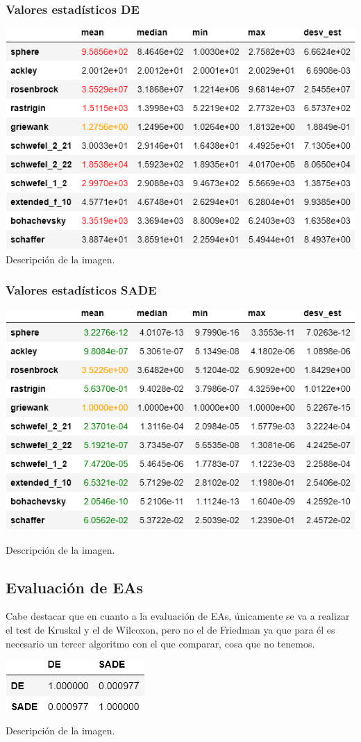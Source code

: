 \documentclass[11pt, a4paper, titlepage]{article}
\begin{document}
\subsubsection{Valores estadísticos DE}
\includegraphics[width=\textwidth]{tableDE.png}
Descripción de la imagen.
\subsubsection{Valores estadísticos SADE}
\begin{center}
\includegraphics[width=\textwidth]{tableSADE.png}
\end{center}
Descripción de la imagen.
\subsection{Evaluación de EAs}
Cabe destacar que en cuanto a la evaluación de EAs, únicamente se va a realizar el test de Kruskal y el de Wilcoxon, pero no el de Friedman ya que para él es necesario un tercer algoritmo con el que comparar, cosa que no tenemos.
\begin{center}
\includegraphics[scale=0.85]{tableWhitney.png}
\end{center}
Descripción de la imagen.
\end{document}
